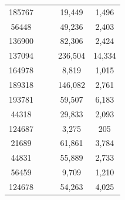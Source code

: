 \documentclass[conference]{IEEEtran}
\begin{document}
\begin{table}[]
\begin{center}
\begin{tabular}{ccccc}
                          185767 & & & 19,449 & 1,496 \\
                          56448 & & & 49,236 & 2,403 \\
                          136900 & & & 82,306 & 2,424 \\
                          137094 & & & 236,504 & 14,334 \\
                          164978 & & & 8,819 & 1,015 \\
                          189318 & & & 146,082 & 2,761 \\
                          193781 & & & 59,507 & 6,183 \\
                          44318 & & & 29,833 & 2,093 \\
                          124687 & & & 3,275 & 205 \\
                          21689 & & & 61,861 & 3,784 \\
                          44831 & & & 55,889 & 2,733 \\
                          56459 & & & 9,709 & 1,210 \\
                          124678 & & & 54,263 & 4,025 \\
  \hline
  \end{tabular}
  \label{tab.res_cost}
  \end{center}
\end{table}
\end{document}

